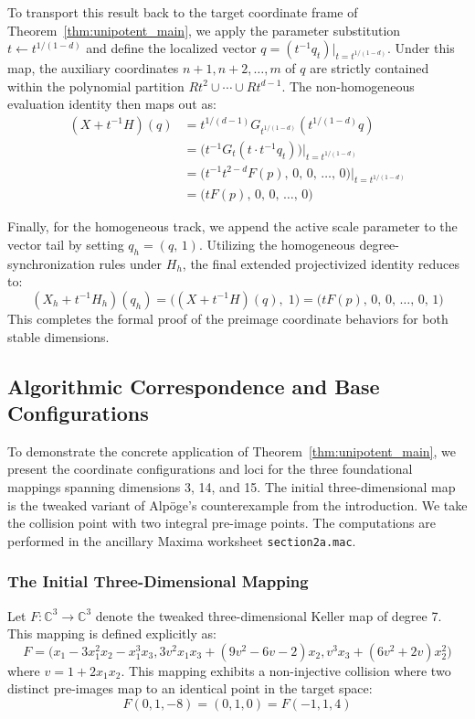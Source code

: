 \documentclass[11pt,a4paper]{article}
\begin{document}
To transport this result back to the target coordinate frame of Theorem~\ref{thm:unipotent_main}, we apply the parameter substitution $t \leftarrow t^{1/(1-d)}$ and define the localized vector $q = (t^{-1} q_t)\big|_{t = t^{1/(1-d)}}$. Under this map, the auxiliary coordinates $n+1, n+2, \dots, m$ of $q$ are strictly contained within the polynomial partition $R t^2 \cup \cdots \cup R t^{d-1}$. The non-homogeneous evaluation identity then maps out as:
\begin{align}
(X + t^{-1} H)(q) &= t^{1/(d-1)} G_{t^{1/(1-d)}}(t^{1/(1-d)} q) \nonumber \\
&= \big(t^{-1} G_t (t \cdot t^{-1} q_t)\big)\big|_{t = t^{1/(1-d)}} \nonumber \\
&= \big(t^{-1} t^{2-d} F(p), \, 0, \, 0, \, \dots, \, 0\big)\big|_{t = t^{1/(1-d)}} \nonumber \\
&= \big(t F(p), \, 0, \, 0, \, \dots, \, 0\big)
\end{align}

Finally, for the homogeneous track, we append the active scale parameter to the vector tail by setting $q_h = (q, \, 1)$. Utilizing the homogeneous degree-synchronization rules under $H_h$, the final extended projectivized identity reduces to:
\begin{equation}
(X_h + t^{-1} H_h) (q_h) = \big((X + t^{-1}H)(q), \; 1\big) = \big(t F(p), \, 0, \, 0, \, \dots, \, 0, \, 1\big)
\end{equation}
This completes the formal proof of the preimage coordinate behaviors for both stable dimensions.

\subsection{Algorithmic Correspondence and Base Configurations}

To demonstrate the concrete application of Theorem~\ref{thm:unipotent_main}, we present the coordinate configurations and loci for the three foundational mappings spanning dimensions 3, 14, and 15. The initial three-dimensional map is  the tweaked variant of Alpöge's counterexample from the introduction. We take the collision point with two integral pre-image points. The computations are performed in the ancillary Maxima worksheet \texttt{section2a.mac}.

\subsubsection{The Initial Three-Dimensional Mapping}
Let $F: \mathbb{C}^3 \to \mathbb{C}^3$ denote the tweaked three-dimensional Keller map of degree 7. This mapping is defined explicitly as:
$$
F = \big(x_1 - 3 x_1^2 x_2 - x_1^3 x_3, 3 v^2 x_1 x_3 + (9 v^2 - 6 v - 2) x_2,  v^3 x_3 + (6 v^2 + 2v) x_2^2\big)
$$
where $v = 1 + 2x_1x_2$. This mapping exhibits a non-injective collision where two distinct pre-images map to an identical point in the target space:
$$
F(0,1,-8) = (0,1,0) = F(-1,1,4)
$$
\end{document}
